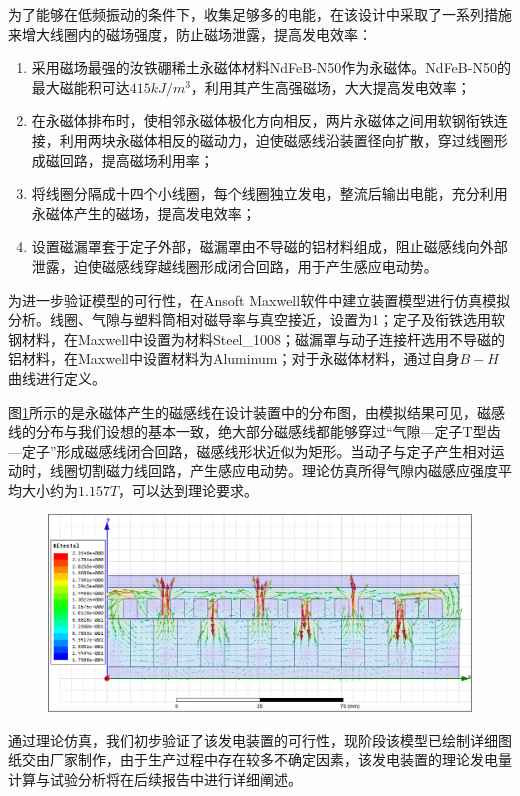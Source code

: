 为了能够在低频振动的条件下，收集足够多的电能，在该设计中采取了一系列措施来增大线圈内的磁场强度，防止磁场泄露，提高发电效率：

\begin{enumerate}[leftmargin=*,labelindent=16pt,label=\bfseries \arabic*.]
	\item 采用磁场最强的汝铁硼稀土永磁体材料NdFeB-N50作为永磁体。NdFeB-N50的最大磁能积可达$415kJ/m^3$，利用其产生高强磁场，大大提高发电效率；
	\item 在永磁体排布时，使相邻永磁体极化方向相反，两片永磁体之间用软钢衔铁连接，利用两块永磁体相反的磁动力，迫使磁感线沿装置径向扩散，穿过线圈形成磁回路，提高磁场利用率；
	\item 将线圈分隔成十四个小线圈，每个线圈独立发电，整流后输出电能，充分利用永磁体产生的磁场，提高发电效率；
	\item 设置磁漏罩套于定子外部，磁漏罩由不导磁的铝材料组成，阻止磁感线向外部泄露，迫使磁感线穿越线圈形成闭合回路，用于产生感应电动势。
\end{enumerate}

为进一步验证模型的可行性，在Ansoft Maxwell软件中建立装置模型进行仿真模拟分析。线圈、气隙与塑料筒相对磁导率与真空接近，设置为1；定子及衔铁选用软钢材料，在Maxwell中设置为材料Steel\_1008；磁漏罩与动子连接杆选用不导磁的铝材料，在Maxwell中设置材料为Aluminum；对于永磁体材料，通过自身$B-H$曲线进行定义。

图\ref{simu}所示的是永磁体产生的磁感线在设计装置中的分布图，由模拟结果可见，磁感线的分布与我们设想的基本一致，绝大部分磁感线都能够穿过“气隙—定子T型齿—定子”形成磁感线闭合回路，磁感线形状近似为矩形。当动子与定子产生相对运动时，线圈切割磁力线回路，产生感应电动势。理论仿真所得气隙内磁感应强度平均大小约为$1.157T$，可以达到理论要求。

\begin{figure}[htb]
	\centering
	\label{simu}
	\includegraphics[width=5in]{figure/simu}
\end{figure}

通过理论仿真，我们初步验证了该发电装置的可行性，现阶段该模型已绘制详细图纸交由厂家制作，由于生产过程中存在较多不确定因素，该发电装置的理论发电量计算与试验分析将在后续报告中进行详细阐述。